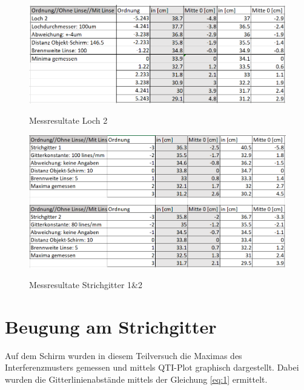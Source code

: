 \begin{figure}[h]
\centering
\includegraphics[width=\textwidth]{Bilder/messung6.png} 
\label{fig:messresultate}
\caption{Messresultate Loch 2}
\end{figure}
\newpage

\begin{figure}[h]
\centering
\includegraphics[width=\textwidth]{Bilder/messung7.png} 
\label{fig:messresultate}
\caption{Messresultate Strichgitter 1\&2}
\end{figure}
\newpage

\section{Beugung am Strichgitter}
\label{sec:BeugungAmStrichgitter} 
Auf dem Schirm wurden in diesem Teilversuch die Maximas des Interferenzmusters gemessen und mittels QTI-Plot graphisch dargestellt. Dabei wurden die Gitterlinienabstände mittels der Gleichung \ref{eq:1} ermittelt.

